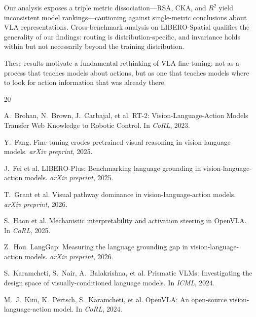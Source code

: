 \documentclass[letterpaper]{article}
\begin{document}
Our analysis exposes a triple metric dissociation---RSA, CKA, and $R^2$ yield inconsistent model rankings---cautioning against single-metric conclusions about VLA representations. Cross-benchmark analysis on LIBERO-Spatial qualifies the generality of our findings: routing is distribution-specific, and invariance holds within but not necessarily beyond the training distribution.

These results motivate a fundamental rethinking of VLA fine-tuning: not as a process that teaches models about actions, but as one that teaches models where to look for action information that was already there.

{\small

\begin{thebibliography}{20}

A.~Brohan, N.~Brown, J.~Carbajal, et al.
\newblock RT-2: Vision-Language-Action Models Transfer Web Knowledge to Robotic Control.
\newblock In \emph{CoRL}, 2023.

Y.~Fang.
\newblock Fine-tuning erodes pretrained visual reasoning in vision-language models.
\newblock \emph{arXiv preprint}, 2025.

J.~Fei et al.
\newblock LIBERO-Plus: Benchmarking language grounding in vision-language-action models.
\newblock \emph{arXiv preprint}, 2025.

T.~Grant et al.
\newblock Visual pathway dominance in vision-language-action models.
\newblock \emph{arXiv preprint}, 2026.

S.~Haon et al.
\newblock Mechanistic interpretability and activation steering in OpenVLA.
\newblock In \emph{CoRL}, 2025.

Z.~Hou.
\newblock LangGap: Measuring the language grounding gap in vision-language-action models.
\newblock \emph{arXiv preprint}, 2026.

S.~Karamcheti, S.~Nair, A.~Balakrishna, et al.
\newblock Prismatic VLMs: Investigating the design space of visually-conditioned language models.
\newblock In \emph{ICML}, 2024.

M.~J.~Kim, K.~Pertsch, S.~Karamcheti, et al.
\newblock OpenVLA: An open-source vision-language-action model.
\newblock In \emph{CoRL}, 2024.


\end{thebibliography}}
\end{document}
